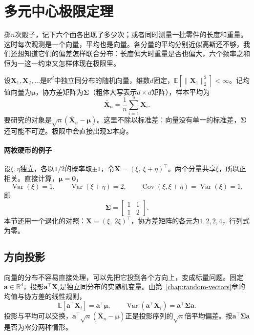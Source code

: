 \section{多元中心极限定理}
\label{sec:clt-multivariate}

掷$n$次骰子，记下六个面各出现了多少次；或者同时测量一批零件的长度和重量。这时每次观测是一个向量，平均也是向量。各分量的平均分别近似高斯还不够，我们还想知道它们的偏差怎样联合分布：长度偏大时重量是否也偏大，六个频率之和恒为一这一约束又怎样体现在极限里。

设$\bm{X}_1,\bm{X}_2,\dots$是$\mathbb{R}^{d}$中独立同分布的随机向量，维数$d$固定，$\mathbb{E}[\lVert\bm{X}_1\rVert_2^2]<\infty$。记均值向量为$\bm{\mu}$，协方差矩阵为$\bm{\Sigma}$（粗体大写表示$d\times d$矩阵），样本平均为
\[
 \bar{\bm{X}}_n=\frac1n\sum_{i=1}^{n}\bm{X}_i .
\]
要研究的对象是$\sqrt{n}(\bar{\bm{X}}_n-\bm{\mu})$。这里不除以标准差：向量没有单一的标准差，$\bm{\Sigma}$还可能不可逆。极限中会直接出现$\bm{\Sigma}$本身。

\paragraph{两枚硬币的例子}
设$\xi,\eta$独立，各以$1/2$的概率取$\pm1$，令$\bm{X}=(\xi,\ \xi+\eta)^{\top}$。两个分量共享$\xi$，所以正相关。直接计算，$\bm{\mu}=\bm{0}$，
\[
 \operatorname{Var}(\xi)=1,\qquad \operatorname{Var}(\xi+\eta)=2,\qquad \operatorname{Cov}(\xi,\xi+\eta)=\operatorname{Var}(\xi)=1 ,
\]
即
\[
 \bm{\Sigma}=\begin{bmatrix}1&1\\1&2\end{bmatrix} .
\]
本节还用一个退化的对照：$\bm{X}=(\xi,\ 2\xi)^{\top}$，协方差矩阵的各元为$1,2,2,4$，行列式为零。

\subsection{方向投影}
\label{sec:clt-projection}

向量的分布不容易直接处理，可以先把它投到各个方向上，变成标量问题。固定$\bm{a}\in\mathbb{R}^{d}$，投影$\bm{a}^{\top}\bm{X}_i$是独立同分布的实随机变量。由第~\ref{chap:random-vectors}章的均值与协方差的线性规则，
\[
 \mathbb{E}[\bm{a}^{\top}\bm{X}_i]=\bm{a}^{\top}\bm{\mu},\qquad \operatorname{Var}(\bm{a}^{\top}\bm{X}_i)=\bm{a}^{\top}\bm{\Sigma}\bm{a} .
\]
投影与平均可以交换，$\bm{a}^{\top}\sqrt{n}(\bar{\bm{X}}_n-\bm{\mu})$正是投影序列的$\sqrt{n}$倍平均偏差。按$\bm{a}^{\top}\bm{\Sigma}\bm{a}$是否为零分两种情形。

